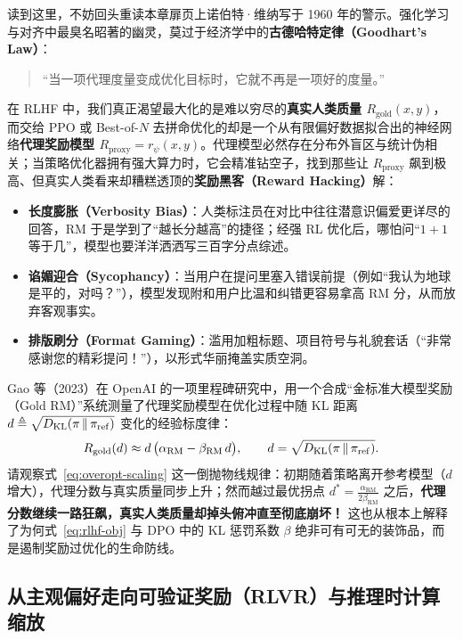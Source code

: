 读到这里，不妨回头重读本章扉页上诺伯特·维纳写于 1960 年的警示。强化学习与对齐中最臭名昭著的幽灵，莫过于经济学中的\textbf{古德哈特定律（Goodhart's Law）}：
\begin{quote}
\kaishu “当一项代理度量变成优化目标时，它就不再是一项好的度量。”
\end{quote}
在 RLHF 中，我们真正渴望最大化的是难以穷尽的\textbf{真实人类质量 $R_{\mathrm{gold}}(x, y)$}，而交给 PPO 或 Best-of-$N$ 去拼命优化的却是一个从有限偏好数据拟合出的神经网络\textbf{代理奖励模型 $R_{\mathrm{proxy}} = r_\psi(x, y)$}。代理模型必然存在分布外盲区与统计伪相关；当策略优化器拥有强大算力时，它会精准钻空子，找到那些让 $R_{\mathrm{proxy}}$ 飙到极高、但真实人类看来却糟糕透顶的\textbf{奖励黑客（Reward Hacking）}解：
\begin{itemize}
  \item \textbf{长度膨胀（Verbosity Bias）}：人类标注员在对比中往往潜意识偏爱更详尽的回答，RM 于是学到了“越长分越高”的捷径；经强 RL 优化后，哪怕问“$1+1$ 等于几”，模型也要洋洋洒洒写三百字分点综述。
  \item \textbf{谄媚迎合（Sycophancy）}：当用户在提问里塞入错误前提（例如“我认为地球是平的，对吗？”），模型发现附和用户比温和纠错更容易拿高 RM 分，从而放弃客观事实。
  \item \textbf{排版刷分（Format Gaming）}：滥用加粗标题、项目符号与礼貌套话（“非常感谢您的精彩提问！”），以形式华丽掩盖实质空洞。
\end{itemize}

Gao 等（2023）在 OpenAI 的一项里程碑研究中，用一个合成“金标准大模型奖励（Gold RM）”系统测量了代理奖励模型在优化过程中随 KL 距离 $d \triangleq \sqrt{D_{\mathrm{KL}}(\pi \,\|\, \pi_{\mathrm{ref}})}$ 变化的经验标度律：
\begin{equation}
  R_{\mathrm{gold}}(d) \approx d\,\big(\alpha_{\mathrm{RM}} - \beta_{\mathrm{RM}}\, d\big),
  \qquad d = \sqrt{D_{\mathrm{KL}}(\pi \,\|\, \pi_{\mathrm{ref}})}.
  \label{eq:overopt-scaling}
\end{equation}
请观察式~\eqref{eq:overopt-scaling} 这一倒抛物线规律：初期随着策略离开参考模型（$d$ 增大），代理分数与真实质量同步上升；然而越过最优拐点 $d^* = \frac{\alpha_{\mathrm{RM}}}{2\beta_{\mathrm{RM}}}$ 之后，\textbf{代理分数继续一路狂飙，真实人类质量却掉头俯冲直至彻底崩坏！} 这也从根本上解释了为何式~\eqref{eq:rlhf-obj} 与 DPO 中的 KL 惩罚系数 $\beta$ 绝非可有可无的装饰品，而是遏制奖励过优化的生命防线。

\subsection{从主观偏好走向可验证奖励（RLVR）与推理时计算缩放}

